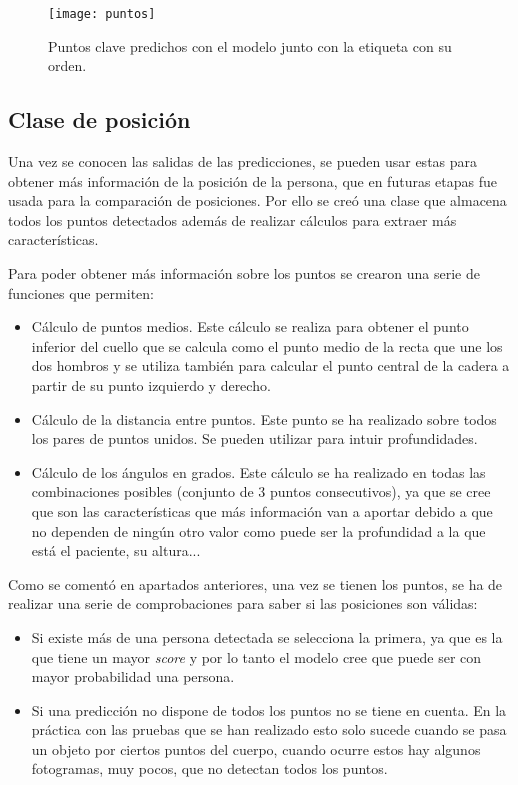 {\begin{figure}[h]
	\centering
	\texttt{[image: puntos]}
	\caption{Puntos clave predichos con el modelo junto con la etiqueta con su orden.}
	\label{fig:puntos}
\end{figure}
\subsection{Clase de posición}
Una vez se conocen las salidas de las predicciones, se pueden usar estas para obtener más información de la posición de la persona, que en futuras etapas fue usada para la comparación de posiciones. Por ello se creó una clase que almacena todos los puntos detectados además de realizar cálculos para extraer más características.

Para poder obtener más información sobre los puntos se crearon una serie de funciones que permiten:
\begin{itemize}
	\item Cálculo de puntos medios. Este cálculo se realiza para obtener el punto inferior del cuello que se calcula como el punto medio de la recta que une los dos hombros y se utiliza también para calcular el punto central de la cadera a partir de su punto izquierdo y derecho.
	\item Cálculo de la distancia entre puntos. Este punto se ha realizado sobre todos los pares de puntos unidos. Se pueden utilizar para intuir profundidades.
	\item Cálculo de los ángulos en grados. Este cálculo se ha realizado en todas las combinaciones posibles (conjunto de 3 puntos consecutivos), ya que se cree que son las características que más información van a aportar debido a que no dependen de ningún otro valor como puede ser la profundidad a la que está el paciente, su altura...
\end{itemize}

Como se comentó en apartados anteriores, una vez se tienen los puntos, se ha de realizar una serie de comprobaciones para saber si las posiciones son válidas:
\begin{itemize}
	\item Si existe más de una persona detectada se selecciona la primera, ya que es la que tiene un mayor \textit{score} y por lo tanto el modelo cree que puede ser con mayor probabilidad una persona.
	\item Si una predicción no dispone de todos los puntos no se tiene en cuenta. En la práctica con las pruebas que se han realizado esto solo sucede cuando se pasa un objeto por ciertos puntos del cuerpo, cuando ocurre estos hay algunos fotogramas, muy pocos, que no detectan todos los puntos.
\end{itemize}

}
